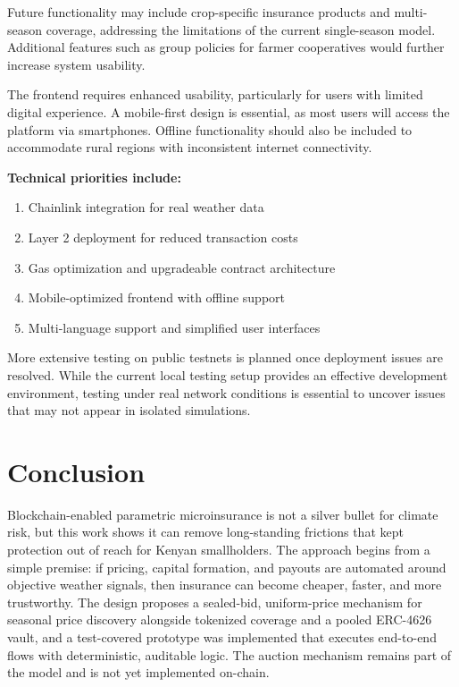 \documentclass[11pt,a4paper]{article}
\begin{document}
		Future functionality may include crop-specific insurance products and multi-season coverage, addressing the limitations of the current single-season model.
		Additional features such as group policies for farmer cooperatives would further increase system usability.

		The frontend requires enhanced usability, particularly for users with limited digital experience.
		A mobile-first design is essential, as most users will access the platform via smartphones.
		Offline functionality should also be included to accommodate rural regions with inconsistent internet connectivity.

		\textbf{Technical priorities include:}

		\begin{enumerate}
			\item Chainlink integration for real weather data
			\item Layer 2 deployment for reduced transaction costs
			\item Gas optimization and upgradeable contract architecture
			\item Mobile-optimized frontend with offline support
			\item Multi-language support and simplified user interfaces
		\end{enumerate}

		More extensive testing on public testnets is planned once deployment issues are resolved.
		While the current local testing setup provides an effective development environment, testing under real network conditions is essential to uncover issues that may not appear in isolated simulations.

		\section{Conclusion}\label{sec:conclusion}
		Blockchain-enabled parametric microinsurance is not a silver bullet for climate risk, but this work shows it can remove long-standing frictions that kept protection out of reach for Kenyan smallholders.
        The approach begins from a simple premise: if pricing, capital formation, and payouts are automated around objective weather signals, then insurance can become cheaper, faster, and more trustworthy.
        The design proposes a sealed-bid, uniform-price mechanism for seasonal price discovery alongside tokenized coverage and a pooled ERC-4626 vault, and a test-covered prototype was implemented that executes end-to-end flows with deterministic, auditable logic. The auction mechanism remains part of the model and is not yet implemented on-chain.
\end{document}

